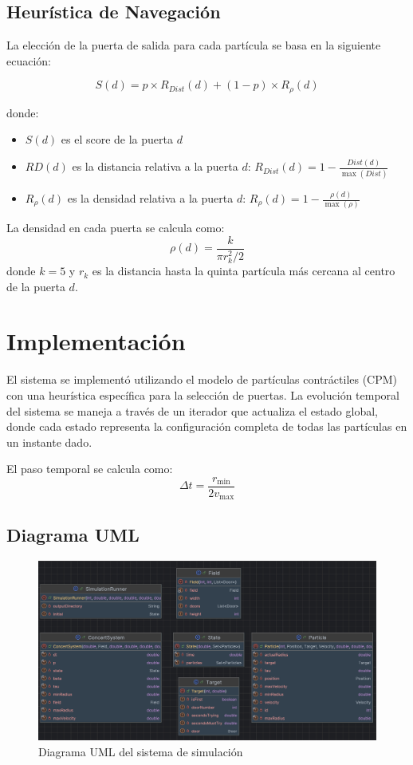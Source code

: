 \documentclass[12pt]{article}
\begin{document}
\subsection{Heurística de Navegación}
La elección de la puerta de salida para cada partícula se basa en la siguiente ecuación:

\begin{equation}
S(d) = p \times R_{Dist}(d) + (1-p) \times R_\rho(d)
\end{equation}

donde:
\begin{itemize}
    \item $S(d)$ es el score de la puerta $d$
    \item $RD(d)$ es la distancia relativa a la puerta $d$: $R_{Dist}(d) = 1 - \frac{Dist(d)}{\max(Dist)}$
    \item $R_\rho(d)$ es la densidad relativa a la puerta $d$: $R_\rho(d) = 1 - \frac{\rho(d)}{\max(\rho)}$
\end{itemize}

La densidad en cada puerta se calcula como:
\begin{equation}
\rho(d) = \frac{k}{\pi r_k^2/2}
\end{equation}
donde $k=5$ y $r_k$ es la distancia hasta la quinta partícula más cercana al centro de la puerta $d$.

\section{Implementación}
El sistema se implementó utilizando el modelo de partículas contráctiles (CPM) con una heurística específica para la selección de puertas. La evolución temporal del sistema se maneja a través de un iterador que actualiza el estado global, donde cada estado representa la configuración completa de todas las partículas en un instante dado.

El paso temporal se calcula como:
\begin{equation}
\Delta t = \frac{r_{\text{min}}}{2v_{\text{max}}}
\end{equation}

\subsection{Diagrama UML}
\begin{figure}[H]
    \centering
    \includegraphics[width=\textwidth]{img/UML.jpg}
    \caption{Diagrama UML del sistema de simulación}
    \label{fig:uml-diagram}
\end{figure}
\end{document}
